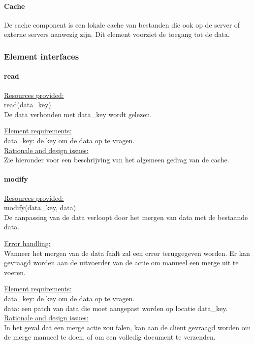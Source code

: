 \documentclass[a4paper,10pt]{article}
\begin{document}
\paragraph{Cache}
De cache component is een lokale cache van bestanden die ook op de server of externe servers aanwezig zijn.  Dit element voorziet de toegang tot de data.

\subsubsection{Element interfaces} 

\paragraph{read}

\underline{Resources provided:}\\
read(data\_key)\\
De data verbonden met data\_key wordt gelezen.

\underline{Element requirements:}\\
data\_key: de key om de data op te vragen.\\

\underline{Rationale and design issues:}\\
Zie hieronder voor een beschrijving van het algemeen gedrag van de cache.

\paragraph{modify}
\underline{Resources provided:}\\
modify(data\_key, data)\\
De aanpassing van de data verloopt door het mergen van data met de bestaande data.

\underline{Error handling:}\\
Wanneer het mergen van de data faalt zal een error teruggegeven worden.  Er kan gevraagd worden aan de uitvoerder van de actie om manueel een merge uit te voeren.

\underline{Element requirements:}\\
data\_key: de key om de data op te vragen.\\
data: een patch van data die moet aangepast worden op locatie data\_key.\\ 

\underline{Rationale and design issues:}\\
In het geval dat een merge actie zou falen, kan aan de client gevraagd worden om de merge manueel te doen, of om een volledig document te verzenden.
\end{document}
